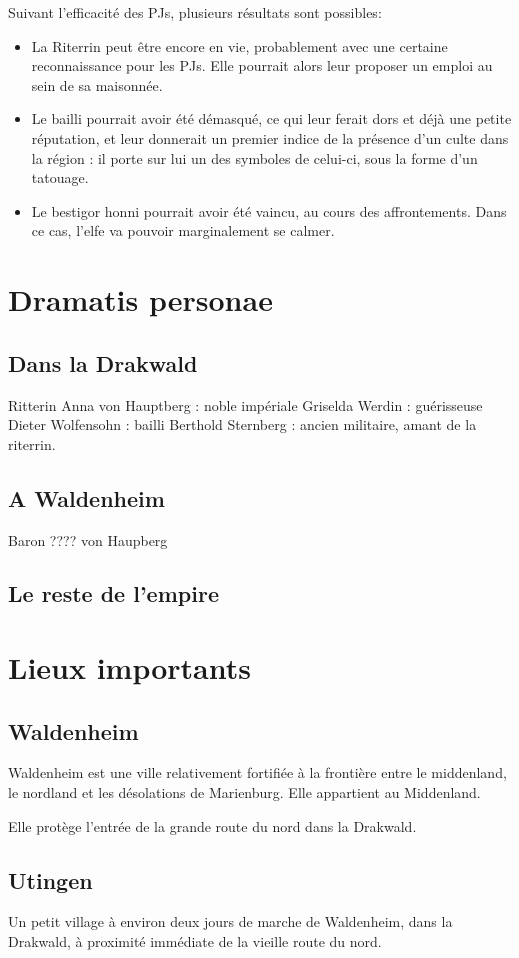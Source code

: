 \documentclass[10pt,a4paper]{book}
\begin{document}
Suivant l'efficacité des PJs, plusieurs résultats sont possibles:
\begin{itemize}
\item La Riterrin peut être encore en vie, probablement avec une certaine reconnaissance pour les PJs. Elle pourrait alors leur proposer un emploi au sein de sa maisonnée.
\item Le bailli pourrait avoir été démasqué, ce qui leur ferait dors et déjà une petite réputation, et leur donnerait un premier indice de la présence d'un culte dans la région : il porte sur lui un des symboles de celui-ci, sous la forme d'un tatouage.
\item Le bestigor honni pourrait avoir été vaincu, au cours des affrontements. Dans ce cas, l'elfe va pouvoir marginalement se calmer.
\end{itemize}
\chapter{Dramatis personae}
\section{Dans la Drakwald}
Ritterin Anna von Hauptberg : noble impériale
Griselda Werdin : guérisseuse
Dieter Wolfensohn : bailli
Berthold Sternberg : ancien militaire, amant de la riterrin.
\section{A Waldenheim}
Baron ???? von Haupberg
\section{Le reste de l'empire}

\chapter{Lieux importants}
\section{Waldenheim}
Waldenheim est une ville relativement fortifiée à la frontière entre le middenland, le nordland et les désolations de Marienburg. Elle appartient au Middenland.

Elle protège l'entrée de la grande route du nord dans la Drakwald.
\section{Utingen}
Un petit village à environ deux jours de marche de Waldenheim, dans la Drakwald, à proximité immédiate de la vieille route du nord. 
\end{document}

